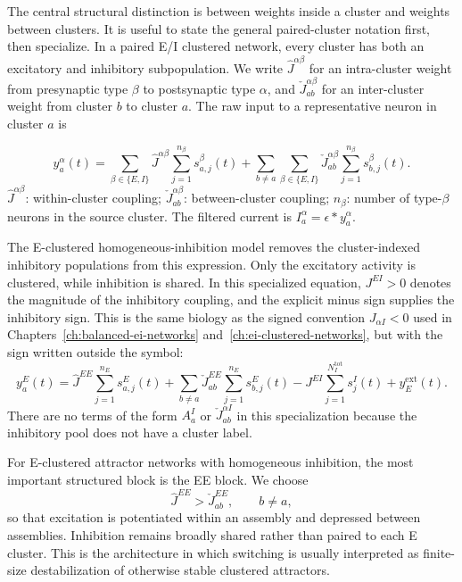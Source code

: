 The central structural distinction is between weights inside a cluster and
weights between clusters. It is useful to state the general paired-cluster
notation first, then specialize. In a paired E/I clustered network, every
cluster has both an excitatory and inhibitory subpopulation. We write
$\hat J^{\alpha\beta}$ for an intra-cluster weight from presynaptic type
$\beta$ to postsynaptic type $\alpha$, and
$\check J_{ab}^{\alpha\beta}$ for an inter-cluster weight from cluster $b$ to
cluster $a$. The raw input to a representative neuron in cluster $a$ is
%
\begin{keyequation}
\begin{equation}
  y_a^\alpha(t)
  =
  \sum_{\beta\in\{E,I\}}
  \hat J^{\alpha\beta}
  \sum_{j=1}^{n_\beta}s_{a,j}^{\beta}(t)
  +
  \sum_{b\neq a}
  \sum_{\beta\in\{E,I\}}
  \check J_{ab}^{\alpha\beta}
  \sum_{j=1}^{n_\beta}s_{b,j}^{\beta}(t).
  \label{eq:ch05-clustered-spiking-input}
\end{equation}
\tcblower
$\hat J^{\alpha\beta}$: within-cluster coupling; $\check J_{ab}^{\alpha\beta}$:
between-cluster coupling; $n_\beta$: number of type-$\beta$ neurons in the
source cluster. The filtered current is $I_a^\alpha=\epsilon*y_a^\alpha$.
\end{keyequation}

\noindent The E-clustered homogeneous-inhibition model removes the
cluster-indexed inhibitory populations from this expression. Only the
excitatory activity is clustered, while inhibition is shared. In this
specialized equation, \(J^{EI}>0\) denotes the magnitude of the inhibitory
coupling, and the explicit minus sign supplies the inhibitory sign. This is the
same biology as the signed convention \(J_{\alpha I}<0\) used in
Chapters~\ref{ch:balanced-ei-networks} and~\ref{ch:ei-clustered-networks}, but
with the sign written outside the symbol:
%
\begin{equation}
  y_a^E(t)
  =
  \hat J^{EE}\sum_{j=1}^{n_E}s_{a,j}^{E}(t)
  +
  \sum_{b\neq a}\check J_{ab}^{EE}\sum_{j=1}^{n_E}s_{b,j}^{E}(t)
  -
  J^{EI}\sum_{j=1}^{N_I^{\mathrm{tot}}}s_j^I(t)
  +
  y_E^{\mathrm{ext}}(t).
  \label{eq:ch05-e-clustered-homogeneous-i-input}
\end{equation}
%
There are no terms of the form $A_a^I$ or
$\check J_{ab}^{\alpha I}$ in this specialization because the inhibitory pool
does not have a cluster label.

For E-clustered attractor networks with homogeneous inhibition, the most
important structured block is the EE block. We choose
%
\begin{equation}
  \hat J^{EE}>\check J_{ab}^{EE},
  \qquad b\neq a,
  \label{eq:ch05-ee-potentiation-depression}
\end{equation}
%
so that excitation is potentiated within an assembly and depressed between
assemblies. Inhibition remains broadly shared rather than paired to each E
cluster. This is the architecture in which switching is usually interpreted as
finite-size destabilization of otherwise stable clustered attractors.

